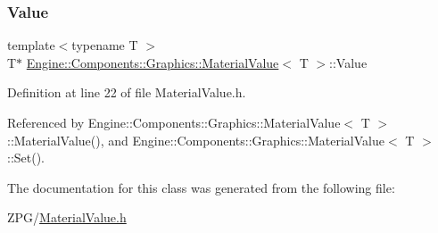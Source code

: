 \subsubsection{\texorpdfstring{Value}{Value}}
{\footnotesize\ttfamily template$<$typename T $>$ \\
T$\ast$ \mbox{\hyperlink{classEngine_1_1Components_1_1Graphics_1_1MaterialValue}{Engine\+::\+Components\+::\+Graphics\+::\+Material\+Value}}$<$ T $>$\+::Value}



Definition at line 22 of file Material\+Value.\+h.



Referenced by Engine\+::\+Components\+::\+Graphics\+::\+Material\+Value$<$ T $>$\+::\+Material\+Value(), and Engine\+::\+Components\+::\+Graphics\+::\+Material\+Value$<$ T $>$\+::\+Set().



The documentation for this class was generated from the following file\+:\begin{DoxyCompactItemize}
\item 
Z\+P\+G/\mbox{\hyperlink{MaterialValue_8h}{Material\+Value.\+h}}\end{DoxyCompactItemize}
